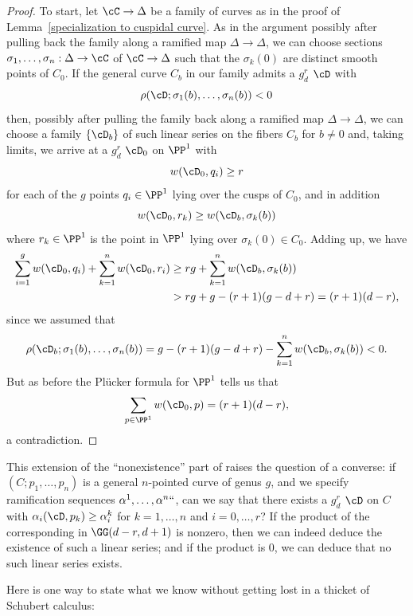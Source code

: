 \begin{proof}
To start, let $\cC \to \Delta$ be a family of curves as in the proof of
Lemma~\ref{specialization to cuspidal curve}.
As in the argument
possibly
after pulling back the family along a ramified map $\Delta \to \Delta$,
we can choose sections $\sigma_1, \dots, \sigma_n : \Delta \to \cC$
of $\cC \to \Delta$ such that the $\sigma_k(0)$ are distinct smooth
points of $C_0$.
If the general curve $C_b$ in our family admits a $g^r_d$ $\cD$ with
$$
\rho(\cD;\sigma_1(b),\dots,\sigma_n(b)) < 0
$$
then, possibly after pulling the family back along a ramified map $\Delta
\to \Delta$, we can choose a family $\{\cD_b\}$ of such linear series
on the fibers $C_b$ for $b \neq 0$ and, taking limits, we arrive at a
$g^r_d$ $\cD_0$ on $\PP^1$ with
$$
w(\cD_0, q_i) \geq r
$$
for each of the $g$ points $q_i \in \PP^1$ lying over the cusps of $C_0$,
and in addition
$$
w(\cD_0, r_k) \geq w(\cD_b,\sigma_k(b))
$$
where $r_k \in \PP^1$ is the point in $\PP^1$ lying over $\sigma_k(0)
\in C_0$. Adding up, we have
\begin{align*}
\sum_{i=1}^g w(\cD_0, q_i) + \sum_{k=1}^n w(\cD_0, r_i) &\geq rg +
\sum_{k=1}^n w(\cD_b,\sigma_k(b)) \\
&> rg + g - (r+1)(g-d+r) = (r+1)(d-r)
,
\end{align*}
since we assumed that
$$
\rho(\cD_b;\sigma_1(b),\dots,\sigma_n(b)) = g - (r+1)(g-d+r) -
\sum_{k=1}^n w(\cD_b,\sigma_k(b)) < 0.
$$
But as before the Pl\"ucker formula for $\PP^1$ tells us that
$$
\sum_{p \in \PP^1} w(\cD_0, p) = (r+1)(d-r),
$$
a contradiction.
\end{proof}

This extension of the ``nonexistence'' part of
raises
the question of a converse: if $(C;p_1,\dots,p_n)$ is a general
$n$-pointed curve of genus $g$, and we specify ramification sequences
$\alpha^1, \dots, \alpha^n` `$, can we say that there exists a $g^r_d$
$\cD$ on $C$ with $\alpha_i(\cD, p_k) \geq \alpha^k_i$ for
$k=1,\dots,n$ and $i = 0, \dots, r$? If the product of the
corresponding
%
in $\GG(d-r, d+1)$ is nonzero, then we
can indeed deduce the existence of such a linear series; and if the
product is 0, we can deduce that no such linear series exists.

Here is one way to state what we know without getting lost in a thicket
of Schubert calculus:


